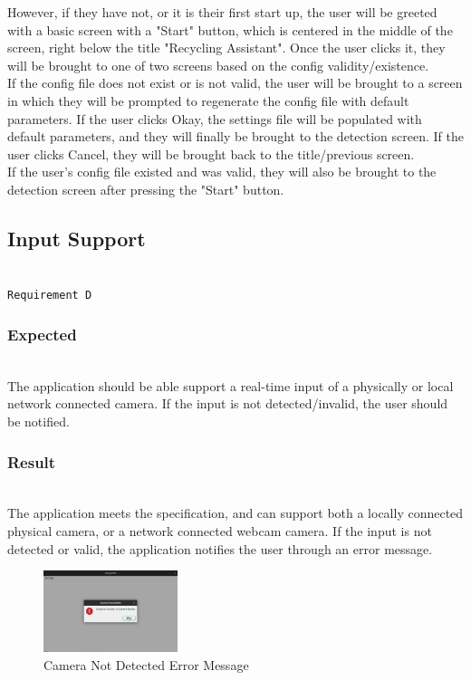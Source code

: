 \documentclass[conference]{IEEEtran}
\begin{document}
However, if they have not, or it is their first start up, the user will be greeted with a basic screen with a "Start" button, which is centered in the middle of the screen, right below the title "Recycling Assistant". Once the user clicks it, they will be brought to one of two screens based on the config validity/existence. \\

If the config file does not exist or is not valid, the user will be brought to a screen in which they will be prompted to regenerate the config file with default parameters. If the user clicks Okay, the settings file will be populated with default parameters, and they will finally be brought to the detection screen. If the user clicks Cancel, they will be brought back to the title/previous screen. \\

If the user's config file existed and was valid, they will also be brought to the detection screen after pressing the "Start" button.~\\

\subsection{Input Support}~\\
\texttt{Requirement D}~\\
\subsubsection{Expected}~\\
The application should be able support a real-time input of a physically or local network connected camera. If the input is not detected/invalid, the user should be notified.~\\

\subsubsection{Result}~\\
The application meets the specification, and can support both a locally connected physical camera, or a network connected webcam camera. If the input is not detected or valid, the application notifies the user through an error message.

\begin{figure}[!h]
    \centering
    \includegraphics[width=0.35\textwidth]{images/camera_source_error.eps}
    \caption{Camera Not Detected Error Message}
\end{figure}~\\
\end{document}
